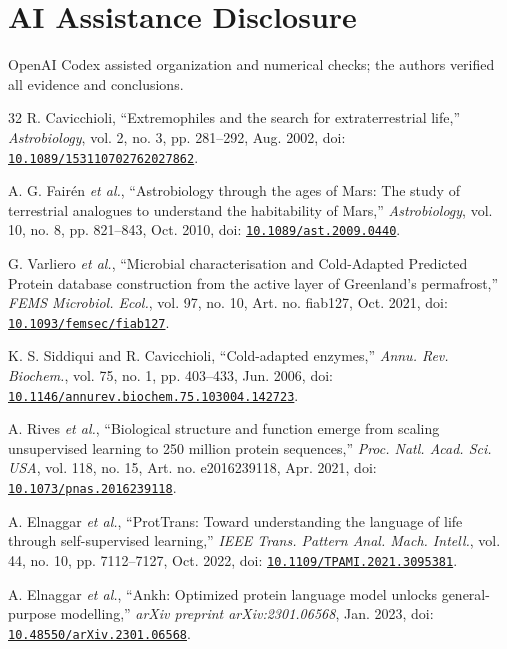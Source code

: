 \documentclass[conference]{IEEEtran}
\begin{document}
\section*{AI Assistance Disclosure}
OpenAI Codex assisted organization and numerical checks; the authors verified all evidence and conclusions.

\FloatBarrier
\begin{thebibliography}{32}
 R. Cavicchioli, ``Extremophiles and the search for extraterrestrial life,'' \textit{Astrobiology}, vol. 2, no. 3, pp. 281--292, Aug. 2002, doi: \href{https://doi.org/10.1089/153110702762027862}{\nolinkurl{10.1089/153110702762027862}}.

 A. G. Fair\'en \textit{et al.}, ``Astrobiology through the ages of Mars: The study of terrestrial analogues to understand the habitability of Mars,'' \textit{Astrobiology}, vol. 10, no. 8, pp. 821--843, Oct. 2010, doi: \href{https://doi.org/10.1089/ast.2009.0440}{\nolinkurl{10.1089/ast.2009.0440}}.

 G. Varliero \textit{et al.}, ``Microbial characterisation and Cold-Adapted Predicted Protein database construction from the active layer of Greenland's permafrost,'' \textit{FEMS Microbiol. Ecol.}, vol. 97, no. 10, Art. no. fiab127, Oct. 2021, doi: \href{https://doi.org/10.1093/femsec/fiab127}{\nolinkurl{10.1093/femsec/fiab127}}.

 K. S. Siddiqui and R. Cavicchioli, ``Cold-adapted enzymes,'' \textit{Annu. Rev. Biochem.}, vol. 75, no. 1, pp. 403--433, Jun. 2006, doi: \href{https://doi.org/10.1146/annurev.biochem.75.103004.142723}{\nolinkurl{10.1146/annurev.biochem.75.103004.142723}}.

 A. Rives \textit{et al.}, ``Biological structure and function emerge from scaling unsupervised learning to 250 million protein sequences,'' \textit{Proc. Natl. Acad. Sci. USA}, vol. 118, no. 15, Art. no. e2016239118, Apr. 2021, doi: \href{https://doi.org/10.1073/pnas.2016239118}{\nolinkurl{10.1073/pnas.2016239118}}.

 A. Elnaggar \textit{et al.}, ``ProtTrans: Toward understanding the language of life through self-supervised learning,'' \textit{IEEE Trans. Pattern Anal. Mach. Intell.}, vol. 44, no. 10, pp. 7112--7127, Oct. 2022, doi: \href{https://doi.org/10.1109/TPAMI.2021.3095381}{\nolinkurl{10.1109/TPAMI.2021.3095381}}.

 A. Elnaggar \textit{et al.}, ``Ankh: Optimized protein language model unlocks general-purpose modelling,'' \textit{arXiv preprint arXiv:2301.06568}, Jan. 2023, doi: \href{https://doi.org/10.48550/arXiv.2301.06568}{\nolinkurl{10.48550/arXiv.2301.06568}}.


\end{thebibliography}
\end{document}
